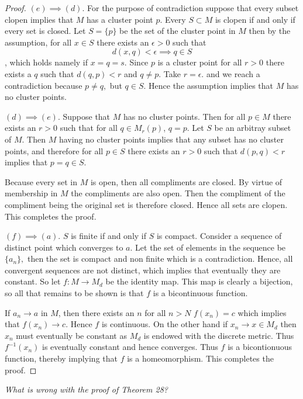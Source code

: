 \documentclass[letter]{article}
\newenvironment{menumerate}{%
  \edef\backupindent{\the\parindent}%
  \enumerate%
  \setlength{\parindent}{\backupindent}%
}{\endenumerate}
\begin{document}
\begin{menumerate}
\begin{proof}
				$(e) \implies (d).$ For the purpose of contradiction suppose that every subset clopen implies that $M$ has a cluster point $p$. Every $S \subset M$ is clopen if and only if every set is closed. Let $S = \{p\}$ be the set of the cluster point in $M$ then by the assumption, for all $x \in S$ there exists an $\epsilon > 0$ such that $$d(x,q) < \epsilon \implies q \in S$$, which holds namely if $x = q= s.$ Since $p$ is a cluster point for all $r > 0$ there exists a $q$ such that $d(q,p) < r$ and $q \neq p.$ Take $r = \epsilon.$ and we reach a contradiction because $p \neq q,$ but $q \in S.$ Hence the assumption implies that $M$ has no cluster points.

				$(d) \implies (e).$ Suppose that $M$ has no cluster points. Then for all $p\in M$ there exists an $r >0$ such that for all $q \in M_r(p)$, $q = p.$ Let $S$ be an arbitray subset of $M.$ Then $M$ having no cluster points implies that any subset has no cluster points, and therefore for all $p \in S$ there exists an $r > 0$ such that $d(p,q) < r$ implies that $p=q\in S$. 

				Because every set in $M$ is open, then all compliments are closed. By virtue of membership in $M$ the compliments are also open. Then the compliment of the compliment being the original set is therefore closed. Hence all sets are clopen. This completes the proof.



				$(f) \implies (a).$
					$S$ is finite if and only if $S$ is compact. Consider a sequence of distinct point which converges to $a.$ Let the set of elements in the sequence be $\{a_n\},$ then the set is compact and non finite which is a contradiction. Hence, all convergent sequences are not distinct, which implies that eventually they are constant. So let $f:M \to M_d$ be the identity map. This map is clearly a bijection, so all that remains to be shown is that $f$ is a bicontinuous function.

					If $a_n \to a$ in $M$, then there exists an $n$ for all $n > N$ $f(x_n) = c$ which implies that $f(x_n) \to c.$ Hence $f$ is continuous. On the other hand if $x_n \to x \in M_d$ then $x_n$ must eventually be constant as $M_d$ is endowed with the discrete metric. Thus $f^{-1}(x_n)$ is eventually constant and hence converges. Thus $f$ is a bicontionuous function, thereby implying that $f$ is a homeomorphism. This completes the proof.
			\end{proof}
			


		\setcounter{enumi}{41}
		\item \emph{What is wrong with the proof of Theorem 28?}


\end{menumerate}
\end{document}
